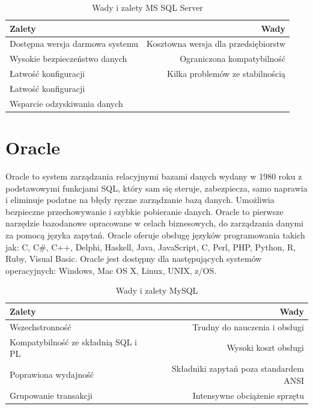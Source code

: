 \documentclass[oneside,polski,logo,indent]{amuthesis}
\begin{document}
\begin{table}[H]
\caption{Wady i zalety MS SQL Server}
\label{tabela-MS SQL Server}
\centering
\begin{adjustbox}{width=1\textwidth}
\small
\begin{tabular}{lr}
\toprule
Zalety & Wady\\
\midrule
Dostępna wersja darmowa systemu & Kosztowna wersja dla przedsiębiorstw\\
Wysokie bezpieczeństwo danych & Ograniczona kompatybilność\\
Łatwość konfiguracji & Kilka problemów ze stabilnością\\
Łatwość konfiguracji & \\
Wsparcie odzyskiwania danych & \\
\bottomrule
\end{tabular}
\end{adjustbox}
\end{table}
\section{Oracle}
Oracle to system zarządzania relacyjnymi bazami danych wydany w 1980 roku z podstawowymi funkcjami SQL, który sam się steruje, zabezpiecza, samo naprawia i eliminuje podatne na błędy ręczne zarządzanie bazą danych. Umożliwia bezpieczne przechowywanie i szybkie pobieranie danych. Oracle to pierwsze narzędzie bazodanowe opracowane w celach biznesowych, do zarządzania danymi za pomocą języka zapytań.
Oracle oferuje obsługę języków programowania takich jak: C, C\#, C++, Delphi, Haskell, Java, JavaScript, C, Perl, PHP, Python, R, Ruby, Visual Basic.
Oracle jest dostępny dla następujących systemów operacyjnych: Windows, Mac OS X, Linux, UNIX, z/OS.

\begin{table}[H]
\caption{Wady i zalety MySQL}
\label{tabela-Oracle}
\centering
\begin{adjustbox}{width=1\textwidth}
\small
\begin{tabular}{lr}
\toprule
Zalety & Wady\\
\midrule
Wszechstronność & Trudny do nauczenia i obsługi\\
Kompatybilność ze składnią SQL i PL & Wysoki koszt obsługi\\
Poprawiona wydajność & Składniki zapytań poza standardem ANSI \\
Grupowanie transakcji & Intensywne obciążenie sprzętu\\
\bottomrule
\end{tabular}
\end{adjustbox}
\end{table}
\end{document}
